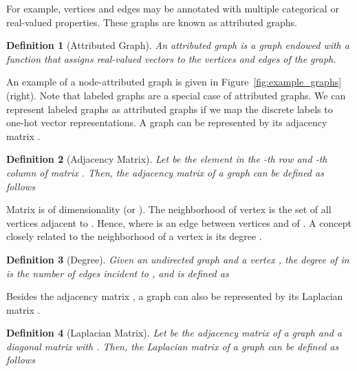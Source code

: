 \documentclass[twoside,11pt]{article}
\newtheorem{definition}{Definition}
\begin{document}
For example, vertices and edges may be annotated with multiple categorical or real-valued properties.
These graphs are known as attributed graphs.
\begin{definition}[Attributed Graph]
    An attributed graph is a graph  endowed with a function  that assigns real-valued vectors to the vertices and edges of the graph.
\end{definition}
An example of a node-attributed graph is given in Figure~\ref{fig:example_graphs} (right).
Note that labeled graphs are a special case of attributed graphs.
We can represent labeled graphs as attributed graphs if we map the discrete labels to one-hot vector representations.
A graph  can be represented by its adjacency matrix .
\begin{definition}[Adjacency Matrix]
    Let  be the element in the -th row and -th column of matrix .
    Then, the adjacency matrix  of a graph  can be defined as follows
    
\end{definition}
Matrix  is of dimensionality  (or ).
The neighborhood  of vertex  is the set of all vertices adjacent to .
Hence,  where  is an edge between vertices  and  of .
A concept closely related to the neighborhood of a vertex  is its degree .
\begin{definition}[Degree]
    Given an undirected graph  and a vertex , the degree of  in  is the number of edges incident to , and is defined as
    
\end{definition}
Besides the adjacency matrix , a graph  can also be represented by its Laplacian matrix .
\begin{definition}[Laplacian Matrix]
    Let  be the adjacency matrix of a graph  and  a diagonal matrix with .
    Then, the Laplacian matrix  of a graph  can be defined as follows
    
\end{definition}
\end{document}
